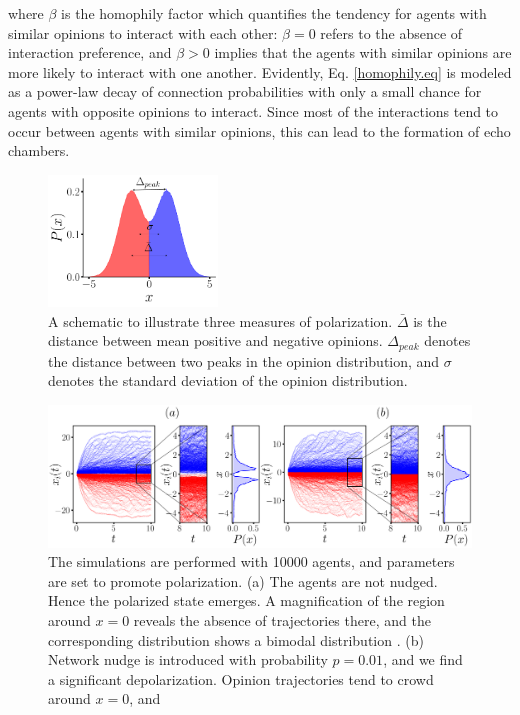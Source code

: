 \documentclass[%
 reprint,
superscriptaddress,
 amsmath,amssymb,
 aps,
 pre,
]{revtex4-1}
\begin{document}
where $\beta$ is the homophily factor which quantifies the tendency for agents with similar opinions to interact with each other: $\beta = 0$ refers to the absence of interaction preference, and $\beta > 0$ implies that the agents with similar opinions are more likely to interact with one another. Evidently, Eq. \ref{homophily.eq} is 
modeled as a power-law decay of connection probabilities with only a small chance for agents with opposite opinions to interact. Since most of the interactions tend to occur between agents with similar opinions, this can lead to the formation of echo chambers.
\begin{figure}[H]
    \label{pol_def.fig}
    \includegraphics[width=0.4\textwidth]{polarization_definition.pdf}
    \caption{A schematic to illustrate three measures of polarization. \textbf{$\bar \Delta$} is the distance between mean positive and negative opinions.
    \textbf{$\Delta_{peak}$} denotes the distance between two peaks in the opinion distribution, and \textbf{$\sigma$} denotes the standard deviation of the opinion distribution.}
    \label{fig:pol_def}
\end{figure}

\begin{figure}[!htpb]
    \includegraphics[width=\textwidth]{trajectory_figma.pdf}
    \caption{ The simulations are performed with 10000 agents, and parameters are set to promote polarization. (a) The agents are not nudged. Hence the polarized state emerges. A magnification of the region around $x=0$ reveals the absence of trajectories there, and the corresponding distribution shows a bimodal distribution . (b) Network nudge is introduced with probability $p=0.01$, and we find a significant depolarization. Opinion trajectories tend to crowd around $x=0$, and }
    \label{fig:trajectory}
\end{figure}
\end{document}
